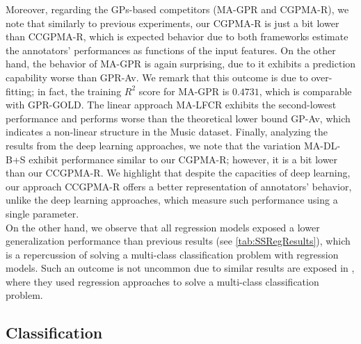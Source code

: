 \documentclass[journal]{IEEEtran}
\begin{document}
Moreover, regarding the GPs-based competitors (MA-GPR and CGPMA-R), we note that similarly to previous experiments, our CGPMA-R is just a bit lower than CCGPMA-R, which is expected behavior due to both frameworks estimate the annotators' performances as functions of the input features. On the other hand, the behavior of MA-GPR is again surprising, due to it exhibits a prediction capability worse than GPR-Av. We remark that this outcome is due to over-fitting; in fact, the training $R^2$ score for MA-GPR is $0.4731$, which is comparable with GPR-GOLD. The linear approach MA-LFCR exhibits the second-lowest performance and performs worse than the theoretical lower bound GP-Av, which indicates a non-linear structure in the Music dataset. Finally, analyzing the results from the deep learning approaches, we note that the variation MA-DL-B+S exhibit performance similar to our CGPMA-R; however, it is a bit lower than our CCGPMA-R. We highlight that despite the capacities of deep learning, our approach CCGPMA-R offers a better representation of annotators' behavior, unlike the deep learning approaches, which measure such performance using a single parameter.\\
On the other hand, we observe that all regression models exposed a lower generalization performance than previous results (see \cref{tab:SSRegResults}), which is a repercussion of solving a multi-class classification problem with regression models. Such an outcome is not uncommon due to similar results are exposed in \cite{rodrigues2017learning,rodrigues2018deep}, where they used regression approaches to solve a multi-class classification problem. 

\subsection{Classification}
\end{document}
